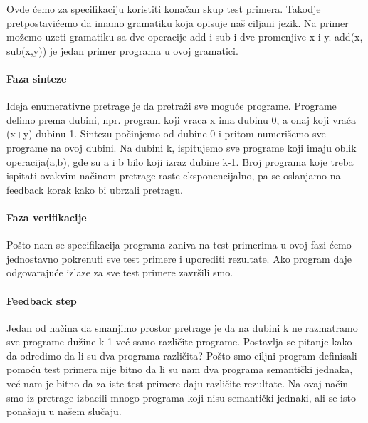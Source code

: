 Ovde ćemo za specifikaciju koristiti konačan skup test primera. Takodje pretpostavićemo da imamo gramatiku koja opisuje naš ciljani jezik. Na primer možemo uzeti gramatiku sa dve operacije add i sub i dve promenjive x i y. add(x, sub(x,y)) je jedan primer programa u ovoj gramatici.

\paragraph{Faza sinteze}

Ideja enumerativne pretrage je da pretraži sve moguće programe. Programe delimo prema dubini, npr. program koji vraca x ima dubinu 0, a onaj koji vraća (x+y) dubinu 1.
Sintezu počinjemo od dubine 0 i pritom numerišemo sve programe na ovoj dubini. Na dubini k, ispitujemo sve programe koji imaju oblik operacija(a,b), gde su a i b bilo koji izraz dubine k-1. Broj programa koje treba ispitati ovakvim načinom pretrage raste eksponencijalno, pa se oslanjamo na feedback korak kako bi ubrzali pretragu.

\paragraph{Faza verifikacije}
Pošto nam se specifikacija programa zaniva na test primerima u ovoj fazi ćemo jednostavno pokrenuti sve test primere i uporediti rezultate. Ako program daje odgovarajuće izlaze za sve test primere završili smo.

\paragraph{Feedback step}
Jedan od načina da smanjimo prostor pretrage je da na dubini k ne razmatramo sve programe dužine k-1 već samo različite programe. Postavlja se pitanje kako da odredimo da li su dva programa različita? Pošto smo ciljni program definisali pomoću test primera nije bitno da li su nam dva programa semantički jednaka, već nam je bitno da  za iste test primere daju različite rezultate. Na ovaj način smo iz pretrage izbacili mnogo programa koji nisu
semantički jednaki, ali se isto ponašaju u našem slučaju.
